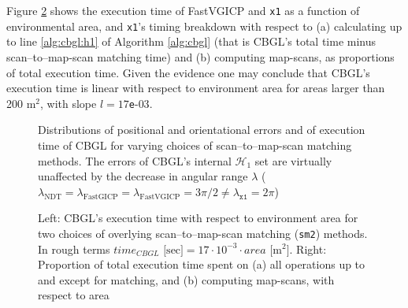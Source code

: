 Figure \ref{fig:c:time_analysis} shows the execution time of FastVGICP and
\texttt{x1} as a function of environmental area, and \texttt{x1}'s timing
breakdown with respect to (a) calculating up to line \ref{alg:cbgl:h1} of
Algorithm \ref{alg:cbgl} (that is CBGL's total time minus scan--to--map-scan
matching time) and (b) computing map-scans, as proportions of total execution
time. Given the evidence one may conclude that CBGL's execution time is linear
with respect to environment area for areas larger than 200 m$^2$, with slope
$l = 17$\texttt{e}-$03$.

\begin{figure}
  
  \vspace{0.1cm}
  \caption{\small Distributions of positional and orientational errors and of
           execution time of CBGL for varying choices of scan--to--map-scan
           matching methods. The errors of CBGL's internal $\mathcal{H}_1$ set
           are virtually unaffected by the decrease in angular range $\lambda$
           ($\lambda_{\text{NDT}} = \lambda_{\text{FastGICP}} =
           \lambda_{\text{FastVGICP}} = 3\pi/2 \neq \lambda_{\texttt{x1}} = 2\pi$)
           }
  \label{fig:c:errors_and_time}
\end{figure}

\begin{figure}
  \vspace{0.5cm}
  
  \vspace{0.2cm}
  \caption{\small Left: CBGL's execution time with respect to environment area
           for two choices of overlying scan--to--map-scan matching
           (\texttt{sm2}) methods. In rough terms
           $time_{CBGL} \text{ [sec]} = 17\cdot10^{-3}\cdot area \text{ [} \text{m}^2 \text{]}$.
           Right: Proportion of total execution time
           spent on (a) all operations up to and except for matching, and (b)
           computing map-scans, with respect to area}
  \label{fig:c:time_analysis}
\end{figure}
